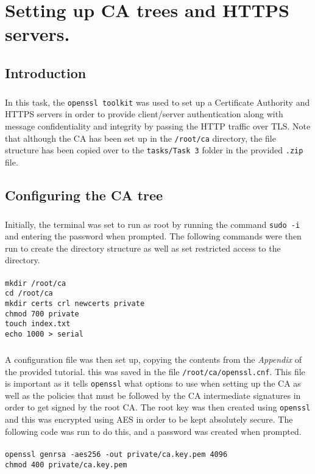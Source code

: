 \chapter{Setting up CA trees and HTTPS servers.}
\section{Introduction}
\paragraph{ }In this task, the \texttt{openssl toolkit} was used to set up a Certificate Authority and HTTPS servers in order to provide client/server authentication along with message confidentiality and integrity by passing the HTTP traffic over TLS. Note that although the CA has been set up in the \texttt{/root/ca} directory, the file structure has been copied over to the \texttt{tasks/Task 3} folder in the provided \texttt{.zip} file.

\section{Configuring the CA tree}
\paragraph{ }Initially, the terminal was set to run as root by running the command \texttt{sudo -i} and entering the password when prompted. The following commands were then run to create the directory structure as well as set restricted access to the directory. \\
\vspace{0pt}\\
\texttt{mkdir /root/ca\\
cd /root/ca\\
mkdir certs crl newcerts private\\
chmod 700 private\\
touch index.txt\\
echo 1000 > serial}

\paragraph{ }A configuration file was then set up, copying the contents from the \textit{Appendix} of the provided tutorial. this was saved in the file \texttt{/root/ca/openssl.cnf}. This file is important as it tells \texttt{openssl} what options to use when setting up the CA as well as the policies that must be followed by the CA intermediate signatures in order to get signed by the root CA. The root key was then created using \texttt{openssl} and this was encrypted using AES in order to be kept absolutely secure. The following code was run to do this, and a password was created when prompted.\\
\vspace{0pt}\\
\texttt{openssl genrsa -aes256 -out private/ca.key.pem 4096\\
chmod 400 private/ca.key.pem}

